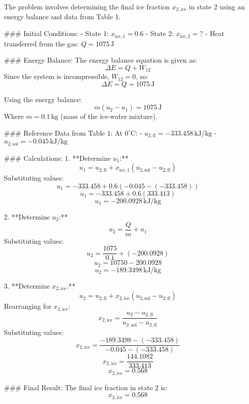 The problem involves determining the final ice fraction \( x_{2,\text{ice}} \) in state 2 using an energy balance and data from Table 1.

### Initial Conditions:
- State 1: \( x_{\text{ice},1} = 0.6 \)
- State 2: \( x_{\text{ice},2} = ? \)
- Heat transferred from the gas: \( Q = 1075 \, \text{J} \)

### Energy Balance:
The energy balance equation is given as:  
\[
\Delta E = Q + W_{12}
\]  
Since the system is incompressible, \( W_{12} = 0 \), so:  
\[
\Delta E = Q = 1075 \, \text{J}
\]  

Using the energy balance:  
\[
m(u_2 - u_1) = 1075 \, \text{J}
\]  
Where \( m = 0.1 \, \text{kg} \) (mass of the ice-water mixture).  

### Reference Data from Table 1:
At \( 0^\circ\text{C} \):  
- \( u_{2,\text{fl}} = -333.458 \, \text{kJ/kg} \)  
- \( u_{2,\text{sol}} = -0.045 \, \text{kJ/kg} \)  

### Calculations:
1. **Determine \( u_1 \):**  
\[
u_1 = u_{2,\text{fl}} + x_{\text{ice},1} (u_{2,\text{sol}} - u_{2,\text{fl}})
\]  
Substituting values:  
\[
u_1 = -333.458 + 0.6 (-0.045 - (-333.458))
\]  
\[
u_1 = -333.458 + 0.6 (333.413)
\]  
\[
u_1 = -200.0928 \, \text{kJ/kg}
\]  

2. **Determine \( u_2 \):**  
\[
u_2 = \frac{Q}{m} + u_1
\]  
Substituting values:  
\[
u_2 = \frac{1075}{0.1} + (-200.0928)
\]  
\[
u_2 = 10750 - 200.0928
\]  
\[
u_2 = -189.3498 \, \text{kJ/kg}
\]  

3. **Determine \( x_{2,\text{ice}} \):**  
\[
u_2 = u_{2,\text{fl}} + x_{2,\text{ice}} (u_{2,\text{sol}} - u_{2,\text{fl}})
\]  
Rearranging for \( x_{2,\text{ice}} \):  
\[
x_{2,\text{ice}} = \frac{u_2 - u_{2,\text{fl}}}{u_{2,\text{sol}} - u_{2,\text{fl}}}
\]  
Substituting values:  
\[
x_{2,\text{ice}} = \frac{-189.3498 - (-333.458)}{-0.045 - (-333.458)}
\]  
\[
x_{2,\text{ice}} = \frac{144.1082}{333.413}
\]  
\[
x_{2,\text{ice}} = 0.568
\]  

### Final Result:
The final ice fraction in state 2 is:  
\[
x_{2,\text{ice}} = 0.568
\]